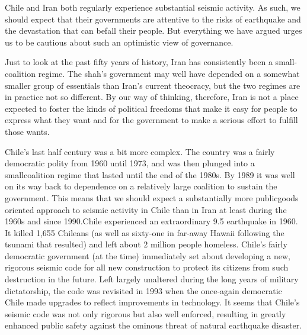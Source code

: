 \documentclass[10pt]{article}
\begin{document}
{\large Chile and Iran both regularly experience substantial seismic activity.
As such, we should expect that their governments are attentive to the risks of
earthquake and the devastation that can befall their people. But everything we
have argued urges us to be cautious about such an optimistic view of governance.}

{\large Just to look at the past fifty years of history, Iran has consistently
been a small-coalition regime. The shah's government may well have depended on a
somewhat smaller group of essentials than Iran's current theocracy, but the two
regimes are in practice not so different. By our way of thinking, therefore, Iran
is not a place expected to foster the kinds of political freedoms that make it
easy for people to express what they want and for the government to make a
serious effort to fulfill those wants.}

{\large Chile's last half century was a bit more complex. The country was a
fairly democratic polity from 1960 until 1973, and was then plunged into a
smallcoalition regime that lasted until the end of the 1980s. By 1989 it was well
on its way back to dependence on a relatively large coalition to sustain the
government. This means that we should expect a substantially more publicgoods
oriented approach to seismic activity in Chile than in Iran at least during the
1960s and since 1990.Chile experienced an extraordinary 9.5 earthquake in 1960.
It killed 1,655 Chileans (as well as sixty-one in far-away Hawaii following the
tsunami that resulted) and left about 2 million people homeless. Chile's fairly
democratic government (at the time) immediately set about developing a new,
rigorous seismic code for all new construction to protect its citizens from such
destruction in the future. Left largely unaltered during the long years of
military dictatorship, the code was revisited in 1993 when the once-again
democratic Chile made upgrades to reflect improvements in technology. It seems
that Chile's seismic code was not only rigorous but also well enforced, resulting
in greatly enhanced public safety against the ominous threat of natural
earthquake disaster.}
\end{document}
